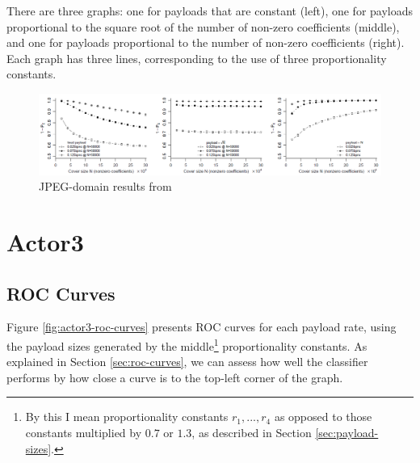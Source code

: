 \documentclass[11pt,a4paper,twoside,openright]{report}
\begin{document}
There are three graphs: one for payloads that are constant (left), one for payloads proportional to the square root of the number of non-zero coefficients (middle), and one for payloads proportional to the number of non-zero coefficients (right). Each graph has three lines, corresponding to the use of three proportionality constants.

\begin{figure}[htbp]
	\begin{center}
		\includegraphics[width=\linewidth]{2008_jpeg_results.png}
		\caption{JPEG-domain results from \cite{2008-paper}}
		\label{fig:2008-jpeg-results}
	\end{center}
\end{figure}


\section{Actor3} \label{sec:actor3-results}

\subsection{ROC Curves} \label{sec:actor3-roc-curves}

Figure \ref{fig:actor3-roc-curves} presents ROC curves for each payload rate, using the payload sizes generated by the middle\footnote{By this I mean proportionality constants $r_1,...,r_4$ as opposed to those constants multiplied by $0.7$ or $1.3$, as described in Section \ref{sec:payload-sizes}.} proportionality constants. As explained in Section \ref{sec:roc-curves}, we can assess how well the classifier performs by how close a curve is to the top-left corner of the graph.
\end{document}
